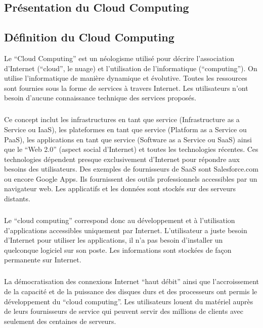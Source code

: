 \documentclass[a4paper,12pt]{report}
\begin{document}
\begin{onehalfspace}
	
	
	\chapter{Présentation du Cloud Computing}


	\section{Définition du Cloud Computing}
	
	Le “Cloud Computing” est un néologisme utilisé pour décrire l’association d’Internet (“cloud”, le nuage) et l’utilisation de l’informatique (“computing”). On utilise l’informatique de manière dynamique et évolutive. Toutes les ressources sont fournies sous la forme de services à travers Internet. Les utilisateurs n’ont besoin d’aucune connaissance technique des services proposés.

	\paragraph*{}
	Ce concept inclut les infrastructures en tant que service (Infrastructure as a Service ou IaaS), les plateformes en tant que service (Platform as a Service ou PaaS), les applications en tant que service (Software as a Service ou SaaS) ainsi que le “Web 2.0” (aspect social d’Internet) et toutes les technologies récentes. Ces technologies dépendent presque exclusivement d’Internet pour répondre aux besoins des utilisateurs. Des exemples de fournisseurs de SaaS sont Salesforce.com ou encore Google Apps. Ils fournissent des outils professionnels accessibles par un navigateur web. Les applicatifs et les données sont stockés sur des serveurs distants.
	
	\paragraph*{}
	Le “cloud computing” correspond donc au développement et à l’utilisation d’applications accessibles uniquement par Internet. L’utilisateur a juste besoin d’Internet pour utiliser les applications, il n’a pas besoin d’installer un quelconque logiciel sur son poste. Les informations sont stockées de façon permanente sur Internet.
	
	\paragraph*{}
	La démocratisation des connexions Internet “haut débit” ainsi que l'accroissement de la capacité et de la puissance des disques durs et des processeurs ont permis le développement du “cloud computing”. Les utilisateurs louent du matériel auprès de leurs fournisseurs de service qui peuvent servir des millions de clients avec seulement des centaines de serveurs.
	

\end{onehalfspace}
\end{document}
